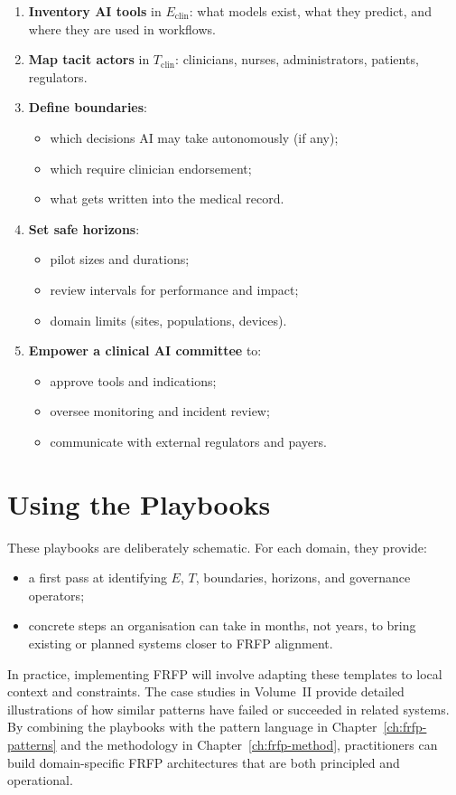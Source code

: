\begin{enumerate}
  \item \textbf{Inventory AI tools} in
        \(E_{\mathrm{clin}}\):
        what models exist, what they predict, and where they are used
        in workflows.
  \item \textbf{Map tacit actors} in
        \(T_{\mathrm{clin}}\):
        clinicians, nurses, administrators, patients, regulators.
  \item \textbf{Define boundaries}:
        \begin{itemize}
          \item which decisions AI may take autonomously (if any);
          \item which require clinician endorsement;
          \item what gets written into the medical record.
        \end{itemize}
  \item \textbf{Set safe horizons}:
        \begin{itemize}
          \item pilot sizes and durations;
          \item review intervals for performance and impact;
          \item domain limits (sites, populations, devices).
        \end{itemize}
  \item \textbf{Empower a clinical AI committee} to:
        \begin{itemize}
          \item approve tools and indications;
          \item oversee monitoring and incident review;
          \item communicate with external regulators and payers.
        \end{itemize}
\end{enumerate}

\section{Using the Playbooks}

These playbooks are deliberately schematic.
For each domain, they provide:

\begin{itemize}
  \item a first pass at identifying \(E\), \(T\), boundaries, horizons,
        and governance operators;
  \item concrete steps an organisation can take in months, not years,
        to bring existing or planned systems closer to FRFP alignment.
\end{itemize}

In practice, implementing FRFP will involve adapting these templates to
local context and constraints.
The case studies in Volume~II provide detailed illustrations of how
similar patterns have failed or succeeded in related systems.
By combining the playbooks with the pattern language in
Chapter~\ref{ch:frfp-patterns} and the methodology in
Chapter~\ref{ch:frfp-method}, practitioners can build domain-specific
FRFP architectures that are both principled and operational.

